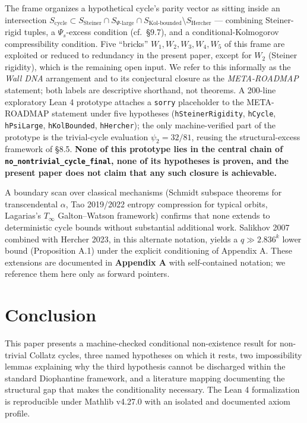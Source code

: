 \documentclass[
  11pt]{amsart}
\newcounter{none} %
\theoremstyle{plain}
\theoremstyle{definition}
\theoremstyle{remark}
\begin{document}
The frame organizes a hypothetical cycle's parity vector as sitting
inside an intersection
\(S_{\mathrm{cycle}} \subset S_{\mathrm{Steiner}} \cap
S_{\Psi\text{-large}} \cap S_{\mathrm{Kol\text{-}bounded}} \setminus
S_{\mathrm{Hercher}}\) --- combining Steiner-rigid tuples, a
\(\Psi_s\)-excess condition (cf.~§9.7), and a conditional-Kolmogorov
compressibility condition. Five ``bricks'' \(W_1, W_2, W_3, W_4, W_5\)
of this frame are exploited or reduced to redundancy in the present
paper, except for \(W_2\) (Steiner rigidity), which is the remaining
open input. We refer to this informally as the \emph{Wall DNA}
arrangement and to its conjectural closure as the \emph{META-ROADMAP}
statement; both labels are descriptive shorthand, not theorems. A
200-line exploratory Lean 4 prototype attaches a \texttt{sorry}
placeholder to the META-ROADMAP statement under five hypotheses
(\texttt{hSteinerRigidity}, \texttt{hCycle}, \texttt{hPsiLarge},
\texttt{hKolBounded}, \texttt{hHercher}); the only machine-verified part
of the prototype is the trivial-cycle evaluation \(\psi_2 = 32/81\),
reusing the structural-excess framework of §8.5. \textbf{None of this
prototype lies in the central chain of
\texttt{no\_nontrivial\_cycle\_final}, none of its hypotheses is proven,
and the present paper does not claim that any such closure is
achievable.}

A boundary scan over classical mechanisms (Schmidt subspace theorems for
transcendental \(\alpha\), Tao 2019/2022 entropy compression for typical
orbits, Lagarias's \(T_\infty\) Galton--Watson framework) confirms that
none extends to deterministic cycle bounds without substantial
additional work. Salikhov 2007 combined with Hercher 2023, in this
alternate notation, yields a \(q \gg 2.836^k\) lower bound (Proposition
A.1) under the explicit conditioning of Appendix A. These extensions are
documented in \textbf{Appendix A} with self-contained notation; we
reference them here only as forward pointers.

\section{Conclusion}\label{conclusion}

This paper presents a machine-checked conditional non-existence result
for non-trivial Collatz cycles, three named hypotheses on which it
rests, two impossibility lemmas explaining why the third hypothesis
cannot be discharged within the standard Diophantine framework, and a
literature mapping documenting the structural gap that makes the
conditionality necessary. The Lean 4 formalization is reproducible under
Mathlib v4.27.0 with an isolated and documented axiom profile.
\end{document}
